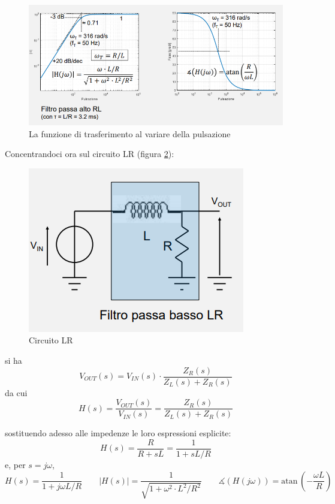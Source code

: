 \documentclass{article}
\begin{document}
\begin{figure}[h]
  \centering
  \includegraphics[scale=0.7]{IM_circuito_RL_passivo_grafici}
  \caption{La funzione di trasferimento al variare della pulsazione}
  \label{Schema_circuito_RL_passivo_grafici}
\end{figure}
\clearpage
Concentrandoci ora sul circuito LR (figura \ref{Schema_circuito_LR_passivo}):

\begin{figure}[h]
  \centering
  \includegraphics[scale=0.55]{IM_circuito_LR_passivo}
  \caption{Circuito LR}
  \label{Schema_circuito_LR_passivo}
\end{figure}

si ha
\[V_{OUT}(s) = V_{IN}(s) \cdot \frac{Z_R(s)}{Z_L(s) + Z_R(s)}\]
da cui 
\[H(s) = \frac{V_{OUT} (s)}{V_{IN} (s)} = \frac{Z_R(s)}{Z_L(s) + Z_R(s)}\]

sostituendo adesso alle impedenze le loro espressioni esplicite:
\[H(s) = \frac{R}{R + sL} = \frac{1}{1 + sL/R}\]
e, per $s = j\omega$, 
\[H(s) = \frac{1}{1 + j \omega L/R} \quad \quad |H(s)| = \frac{1}{\sqrt{1 + \omega ^2 \cdot L^2 / R^2}} \quad \quad \measuredangle (H(j \omega)) = \textrm{atan}\, \left(-\frac{\omega L}{ R}\right)\]
\end{document}
